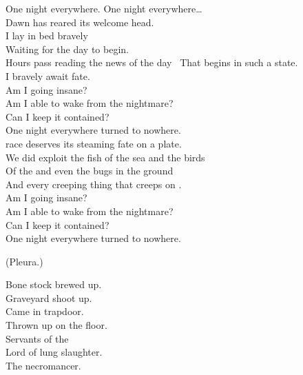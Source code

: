 



One night everywhere. One night everywhere… \\

Dawn has reared its welcome head. \\
I lay in bed bravely \\
Waiting for the day to begin. \\

Hours pass reading the news of the day \
That begins in such a state. \\
I bravely await fate. \\

Am I going insane? \\
Am I able to wake from the nightmare? \\
Can I keep it contained? \\
One night everywhere turned to nowhere. \\

 race deserves its steaming fate on a plate. \\
We did exploit the fish of the sea and the birds \\
Of the  and even the bugs in the ground \\
And every creeping thing that creeps on \word{Earth}. \\

Am I going insane? \\
Am I able to wake from the nightmare? \\
Can I keep it contained? \\
One night everywhere turned to nowhere. \\





(Pleura.)

Bone stock brewed up. \\
Graveyard shoot up. \\
Came in trapdoor. \\
Thrown up on the floor. \\
Servants of the \\
Lord of lung slaughter. \\
The necromancer. \\

